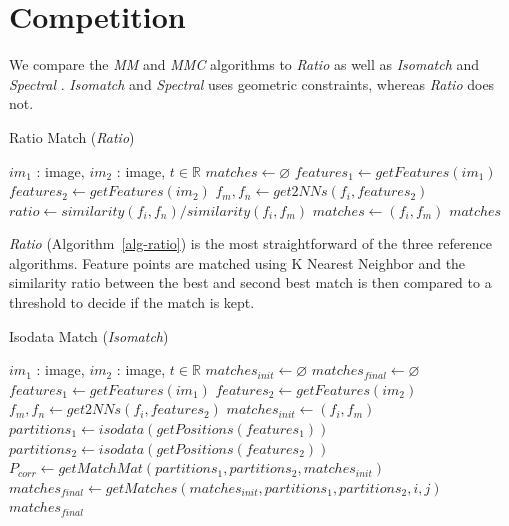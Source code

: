 \chapter{Competition}

We compare the \emph{MM} and \emph{MMC} algorithms to \emph{Ratio} 
\cite{lowe2004sift} as well as \emph{Isomatch} \cite{das2008event} and 
\emph{Spectral} \cite{leordeanu2005spectral}.  \emph{Isomatch} and 
\emph{Spectral} uses geometric constraints, whereas \emph{Ratio} does 
not.

\begin{algorithm}
\caption{Ratio Match (\emph{Ratio})}
\label{alg-ratio}
\begin{algorithmic}
\Require $im_1$ : image, $im_2$ : image, $t \in \mathbb{R}$
\State $matches\gets \varnothing$
\State $features_1 \gets getFeatures(im_1)$
\State $features_2 \gets getFeatures(im_2)$
    \State $f_m,f_n \gets get2NNs(f_i, features_2)$
	\State $ratio \gets similarity(f_i, f_n) / similarity(f_i, f_m)$
        \State $matches \gets \left(f_i, f_m\right)$
	\EndIf
\EndFor
\Return $matches$
\end{algorithmic}
\end{algorithm}

\emph{Ratio} (Algorithm~\ref{alg-ratio}) \cite{lowe2004sift} is the most 
straightforward of the three reference algorithms. Feature points are 
matched using K Nearest Neighbor and the similarity ratio between the 
best and second best match is then compared to a threshold to decide if 
the match is kept.

\begin{algorithm}
\caption{Isodata Match (\emph{Isomatch})}
\label{alg-isodata}
\begin{algorithmic}
\Require $im_1$ : image, $im_2$ : image, $t \in \mathbb{R}$
\State $matches_{init}\gets \varnothing$
\State $matches_{final}\gets \varnothing$
\State $features_1 \gets getFeatures(im_1)$
\State $features_2 \gets getFeatures(im_2)$
    \State $f_m,f_n \gets get2NNs(f_i, features_2)$
    \State $matches_{init} \gets \left(f_i, f_m\right)$
\EndFor
\State $partitions_1 \gets isodata(getPositions(features_1))$
\State $partitions_2 \gets isodata(getPositions(features_2))$
\State $P_{corr} \gets getMatchMat(partitions_1, partitions_2, 
matches_{init})$
        \State $matches_{final} \gets getMatches(matches_{init}, 
        partitions_1, partitions_2, i, j)$
    \EndIf
\EndFor
\Return $matches_{final}$
\end{algorithmic}
\end{algorithm}

